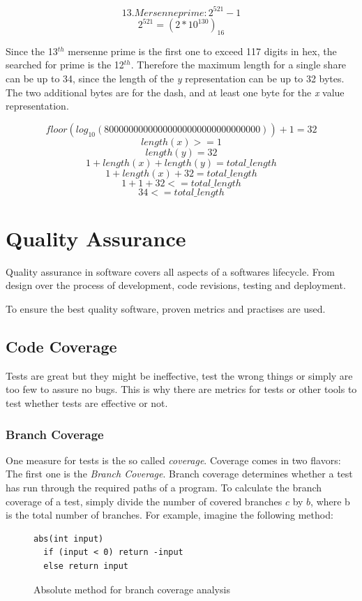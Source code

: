$$13. Mersenne prime: 2^{521}-1$$
$$2^{521} = (2*10^{130})_{16}$$

Since the 13$^{th}$ mersenne prime is the first one to exceed 117 digits in
hex, the searched for prime is the 12$^{th}$. Therefore the maximum length for
a single share can be up to 34, since the length of the \textit{y}
representation can be up to 32 bytes. The two additional bytes are for the
dash, and at least one byte for the \textit{x} value representation.

$$floor(log_{10}(80000000000000000000000000000000)) + 1 = 32$$
$$length(x) >= 1$$
$$length(y) = 32$$
$$1 + length(x) + length(y) = total\_length$$
$$1 + length(x) + 32 = total\_length$$
$$1 + 1 + 32 <= total\_length$$
$$34 <= total\_length$$

\chapter{Quality Assurance}

Quality assurance in software covers all aspects of a softwares lifecycle.
From design over the process of development, code revisions, testing and
deployment.

To ensure the best quality software, proven metrics and practises are used.

\section{Code Coverage}

Tests are great but they might be ineffective, test the wrong things
or simply are too few to assure no bugs. This is why there are metrics
for tests or other tools to test whether tests are effective or not.

\subsection{Branch Coverage}

One measure for tests is the so called \textit{coverage}. Coverage
comes in two flavors: The first one is the \textit{Branch Coverage}.
Branch coverage determines whether a test has run through the
required paths of a program. To calculate the branch coverage of a test,
simply divide the number of covered branches $c$ by $b$, where b is the
total number of branches. For example, imagine the following
method:

\begin{figure}
\begin{lstlisting}
abs(int input)
  if (input < 0) return -input
  else return input
\end{lstlisting}
\caption{Absolute method for branch coverage analysis}
\label{code:branchCoverage}
\end{figure}

